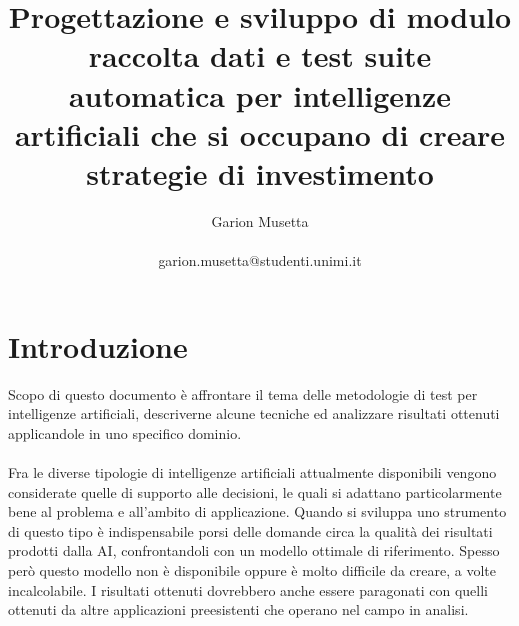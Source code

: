 \documentclass{article}
\title{\textbf{Progettazione e sviluppo di modulo raccolta dati e test suite automatica per intelligenze artificiali che si occupano di creare strategie di investimento}}
\author{Garion Musetta\\~\\garion.musetta@studenti.unimi.it}
\numberwithin{equation}{section}
\begin{document}
	\maketitle   
	\newpage
	\tableofcontents

	\newpage 
	 
	 
   	\section{Introduzione}
		Scopo di questo documento è affrontare il tema delle metodologie di test per intelligenze artificiali, descriverne alcune tecniche ed analizzare risultati ottenuti applicandole in uno specifico dominio.
		\\~\\
		Fra le diverse tipologie di intelligenze artificiali attualmente disponibili vengono considerate quelle di supporto alle decisioni, le quali si adattano particolarmente bene al problema e all'ambito di applicazione. Quando si sviluppa uno strumento di questo tipo è indispensabile porsi delle domande circa la qualità dei risultati prodotti dalla AI, confrontandoli con un modello ottimale di riferimento. Spesso però questo modello non è disponibile oppure è molto difficile da creare, a volte incalcolabile. I risultati ottenuti dovrebbero anche essere paragonati con quelli ottenuti da altre applicazioni preesistenti che operano nel campo in analisi.
\end{document}
